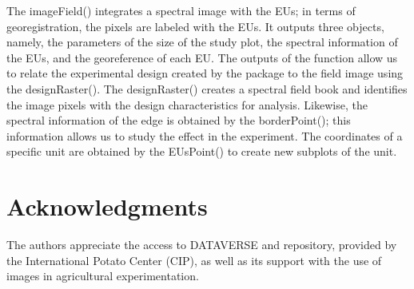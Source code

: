 The imageField() integrates a spectral image with the EUs; in terms of georegistration, the pixels are labeled with the EUs. It outputs three objects, namely, the parameters of the size of the study plot, the spectral information of the EUs, and the georeference of each EU. The outputs of the function allow us to relate the experimental design created by the  package to the field image using the designRaster(). The designRaster() creates a spectral field book and identifies the image pixels with the design characteristics for analysis. Likewise, the spectral information of the edge is obtained by the borderPoint(); this information allows us to study the effect in the experiment. The coordinates of a specific unit are obtained by the EUsPoint() to create new subplots of the unit.

\section{Acknowledgments}\label{acknowledgments}

The authors appreciate the access to DATAVERSE and repository, provided by the International Potato Center (CIP), as well as its support with the use of images in agricultural experimentation.



\address{%
Felipe de Mendiburu\\
Universidad Nacional de Ingeniería and Universidad Nacional Agraria La Molina\\%
Av. Tupac Amaru 210, apartado 1301, Rimac\\ Lima, Peru\\ \href{mailto:felipe.demendiburu.d@uni.pe}{\nolinkurl{felipe.demendiburu.d@uni.pe}}\\ also\\ Av. La Molina s/n, La Molina\\ Lima, Peru\\
%
%
\textit{ORCiD: \href{https://orcid.org/0000-0003-2725-5911}{0000-0003-2725-5911}}\\%
\href{mailto:fmendiburu@lamolina.edu.pe}{\nolinkurl{fmendiburu@lamolina.edu.pe}}%
}

\address{%
Augusto Choy\\
Universidad Nacional de Ingeniería and ESAN University\\%
Av. Tupac Amaru 210, apartado 1301, Rimac\\ Lima, Peru\\ \href{mailto:augusto.choy.p@uni.pe}{\nolinkurl{augusto.choy.p@uni.pe}}\\ also\\ Av. Alonso de Molina 1652, Apartado 1846, Surco\\ Lima, Peru\\
%
%
\textit{ORCiD: \href{https://orcid.org/0000-0002-8940-6896}{0000-0002-8940-6896}}\\%
\href{mailto:achoy@esan.edu.pe}{\nolinkurl{achoy@esan.edu.pe}}%
}

